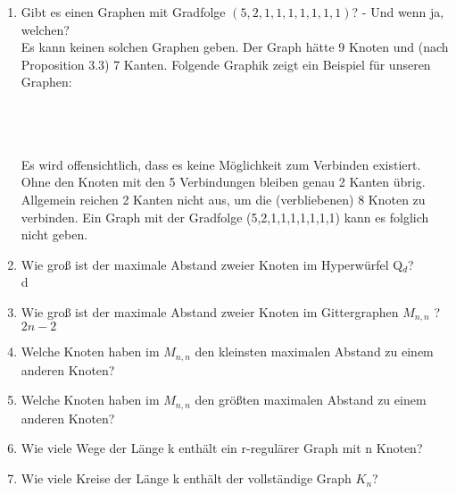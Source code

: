 \begin{enumerate}[label=(\alph*)]
        \item Gibt es einen Graphen mit Gradfolge $(5, 2, 1, 1, 1, 1, 1, 1, 1)$? - Und wenn ja, welchen?\\
        Es kann keinen solchen Graphen geben. Der Graph hätte 9 Knoten und (nach Proposition 3.3) 7 Kanten. Folgende Graphik zeigt ein Beispiel für unseren Graphen: 
        \\\\
        \\\\
        Es wird offensichtlich, dass es keine Möglichkeit zum Verbinden existiert. Ohne den Knoten mit den 5 Verbindungen bleiben genau 2 Kanten übrig. Allgemein reichen 2 Kanten  nicht aus, um die (verbliebenen) 8 Knoten zu verbinden. Ein Graph mit der Gradfolge (5,2,1,1,1,1,1,1,1) kann es folglich nicht geben. 
          
        \item Wie groß ist der maximale Abstand zweier Knoten im Hyperwürfel Q$_d$? \\
        d \par
        
        \item Wie groß ist der maximale Abstand zweier Knoten im Gittergraphen $M_{n,n} $ ? \\
        $2n - 2$
        
        \item Welche Knoten haben im $M_{n,n}$ den kleinsten maximalen Abstand zu einem anderen Knoten? \\
        
        \item Welche Knoten haben im $M_{n,n}$ den größten maximalen Abstand zu einem anderen Knoten? \\
        
        \item Wie viele Wege der Länge k enthält ein r-regulärer Graph mit n Knoten? \\
        
        \item Wie viele Kreise der Länge k enthält der vollständige Graph $K_n$? \\
        
        
    \end{enumerate}
